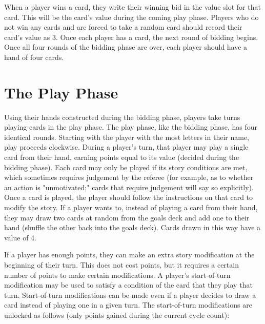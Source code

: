 \documentclass[12pt]{article}
\begin{document}
When a player wins a card, they write their winning bid in the value slot for that card.
%
This will be the card's value during the coming play phase.
%
Players who do not win any cards and are forced to take a random card should record their card's value as 3.
%
Once each player has a card, the next round of bidding begins.
%
Once all four rounds of the bidding phase are over, each player should have a hand of four cards.

\section{The Play Phase}

Using their hands constructed during the bidding phase, players take turns playing cards in the play phase.
%
The play phase, like the bidding phase, has four identical rounds.
%
Starting with the player with the most letters in their name, play proceeds clockwise. 
%
During a player's turn, that player may play a single card from their hand, earning points equal to its value (decided during the bidding phase).
%
Each card may only be played if its story conditions are met, which sometimes requires judgement by the referee (for example, as to whether an action is "unmotivated;" cards that require judgement will say so explicitly).
%
Once a card is played, the player should follow the instructions on that card to modify the story.
%
If a player wants to, instead of playing a card from their hand, they may draw two cards at random from the goals deck and add one to their hand (shuffle the other back into the goals deck).
%
Cards drawn in this way have a value of 4.


If a player has enough points, they can make an extra story modification at the beginning of their turn.
%
This does not cost points, but it requires a certain number of points to make certain modifications.
%
A player's start-of-turn modification may be used to satisfy a condition of the card that they play that turn.
%
Start-of-turn modifications can be made even if a player decides to draw a card instead of playing one in a given turn.
%
The start-of-turn modifications are unlocked as follows (only points gained during the current cycle count):
\end{document}
